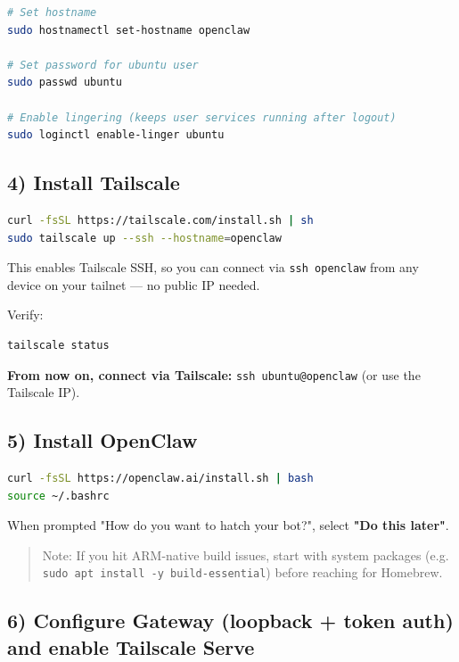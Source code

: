 \begin{lstlisting}[language=bash]
# Set hostname
sudo hostnamectl set-hostname openclaw

# Set password for ubuntu user
sudo passwd ubuntu

# Enable lingering (keeps user services running after logout)
sudo loginctl enable-linger ubuntu
\end{lstlisting}


\subsection{4) Install Tailscale}


\begin{lstlisting}[language=bash]
curl -fsSL https://tailscale.com/install.sh | sh
sudo tailscale up --ssh --hostname=openclaw
\end{lstlisting}


This enables Tailscale SSH, so you can connect via \texttt{ssh openclaw} from any device on your tailnet — no public IP needed.

Verify:

\begin{lstlisting}[language=bash]
tailscale status
\end{lstlisting}


\textbf{From now on, connect via Tailscale:} \texttt{ssh ubuntu@openclaw} (or use the Tailscale IP).

\subsection{5) Install OpenClaw}


\begin{lstlisting}[language=bash]
curl -fsSL https://openclaw.ai/install.sh | bash
source ~/.bashrc
\end{lstlisting}


When prompted "How do you want to hatch your bot?", select \textbf{"Do this later"}.

\begin{quote}
Note: If you hit ARM-native build issues, start with system packages (e.g. \texttt{sudo apt install -y build-essential}) before reaching for Homebrew.
\end{quote}


\subsection{6) Configure Gateway (loopback + token auth) and enable Tailscale Serve}


